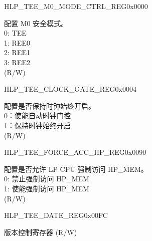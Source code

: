 \begin{register}{H}{LP\_TEE\_M0\_MODE\_CTRL\_REG}{0x0000}\label{regdesc:LPTEEM0MODECTRLREG}
%
%
\regnewline%
\begin{regdesc}\begin{reglist}
\label{fielddesc:LPTEEM0MODE}\item [LP\_TEE\_M0\_MODE] 配置 M0 安全模式。\\
0: TEE \\
1: REE0 \\
2: REE1 \\
3: REE2  \\
(R/W)
\end{reglist}\end{regdesc}
\end{register}


\begin{register}{H}{LP\_TEE\_CLOCK\_GATE\_REG}{0x0004}\label{regdesc:LPTEECLOCKGATEREG}
%
%
\regnewline%
\begin{regdesc}\begin{reglist}
\label{fielddesc:LPTEECLKEN}\item [LP\_TEE\_CLK\_EN] 配置是否保持时钟始终开启。\\
0：使能自动时钟门控 \\
1：保持时钟始终开启 \\ (R/W)
\end{reglist}\end{regdesc}
\end{register}


\begin{register}{H}{LP\_TEE\_FORCE\_ACC\_HP\_REG}{0x0090}\label{regdesc:LPTEEFORCEACCHPREG}
%
%
\regnewline%
\begin{regdesc}\begin{reglist}
\label{fielddesc:LPTEEFORCEACCHPMEMEN}\item [LP\_TEE\_FORCE\_ACC\_HPMEM\_EN] 配置是否允许 LP CPU 强制访问 HP\_MEM。\\
0: 禁止强制访问 HP\_MEM \\
1: 使能强制访问 HP\_MEM  \\ (R/W)
\end{reglist}\end{regdesc}
\end{register}


\begin{register}{H}{LP\_TEE\_DATE\_REG}{0x00FC}\label{regdesc:LPTEEDATEREG}
%
%
\regnewline%
\begin{regdesc}\begin{reglist}
\label{fielddesc:LPTEEDATEREG}\item [LP\_TEE\_DATE\_REG] 版本控制寄存器 (R/W)
\end{reglist}\end{regdesc}
\end{register}